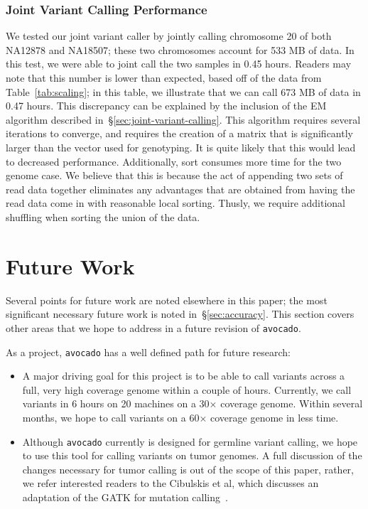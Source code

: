 \documentclass{acm_proc_article-sp}
\begin{document}
\subsubsection{Joint Variant Calling Performance}
\label{sec:jvc-performance}

We tested our joint variant caller by jointly calling chromosome 20 of both NA12878 and NA18507; these two chromosomes account
for 533 MB of data. In this test, we were able to joint call the two samples in 0.45 hours. Readers may note that this number is lower
than expected, based off of the data from Table~\ref{tab:scaling}; in this table, we illustrate that we can call 673 MB of data in 0.47 hours.
This discrepancy can be explained by the inclusion of the EM algorithm described in~\S\ref{sec:joint-variant-calling}. This algorithm requires
several iterations to converge, and requires the creation of a matrix that is significantly larger than the vector used for genotyping. It is quite likely
that this would lead to decreased performance. Additionally, sort consumes more time for the two genome case. We believe that this is because
the act of appending two sets of read data together eliminates any advantages that are obtained from having the read data come in with
reasonable local sorting. Thusly, we require additional shuffling when sorting the union of the data.

\section{Future Work}
\label{sec:future-work}


Several points for future work are noted elsewhere in this paper; the most significant necessary future work is noted
in~\S\ref{sec:accuracy}. This section covers other areas that we hope to address in a future revision of \texttt{avocado}.

As a project, \texttt{avocado} has a well defined path for future research:

\begin{itemize}
\item A major driving goal for this project is to be able to call variants across a full, very high coverage genome within a
couple of hours. Currently, we call variants in 6 hours on 20 machines on a 30$\times$ coverage genome. Within several
months, we hope to call variants on a 60$\times$ coverage genome in less time.
\item Although \texttt{avocado} currently is designed for germline variant calling, we hope to use this tool for calling
variants on tumor genomes. A full discussion of the changes necessary for tumor calling is out of the scope of this paper,
rather, we refer interested readers to the Cibulskis et al, which discusses an adaptation of the GATK for mutation calling~\cite{cibulskis13}.
\end{itemize}
\end{document}
